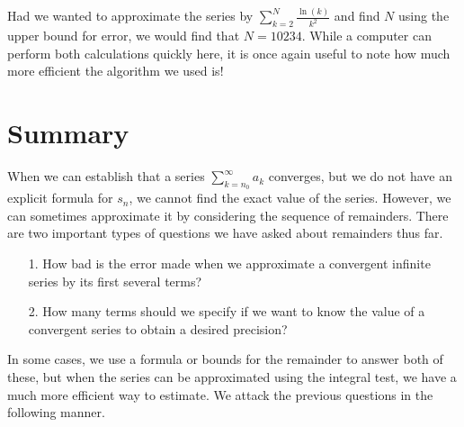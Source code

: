 \documentclass{ximera}
\begin{document}
\begin{example}
\begin{example}
\begin{explanation}
\begin{remark}
Had we wanted to approximate the series by $\sum_{k=2}^N \frac{\ln(k)}{k^2}$ and find $N$ using the upper bound for error, we would find that $N=10234$.  While a computer can perform both calculations quickly here, it is once again useful to note how much more efficient the algorithm we used is!
\end{remark}

\end{explanation}
\end{example}
\end{example}


\section{Summary}

When we can establish that a series $\sum_{k=n_0}^{\infty} a_k$ converges, but we do not have an explicit formula for $s_n$, we cannot find the exact value of the series.  However, we can sometimes approximate it by considering the sequence of remainders.  There are two important types of questions we have asked about remainders thus far.

\begin{itemize}
\item[1.] How bad is the error made when we approximate a convergent infinite series by its first several terms?
\item[2.] How many terms should we specify if we want to know the value of a convergent series to obtain a desired precision?
\end{itemize}

In some cases, we use a formula or bounds for the remainder to answer both of these, but when the series can be approximated using the integral test, we have a much more efficient way to estimate.  We attack the previous questions in the following manner.
\end{document}
